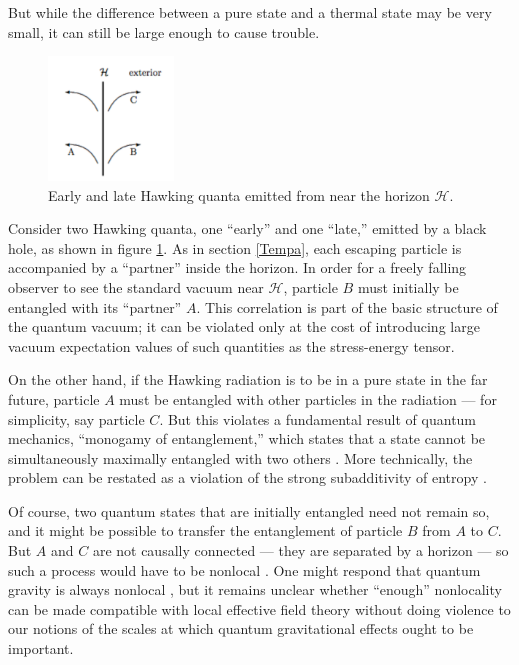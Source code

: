 \documentclass[12pt]{article}
\begin{document}
But while the difference between a pure state and a thermal state
may be very small, it can still be large enough to cause trouble.
\begin{figure}
\centerline{\includegraphics[height=1.3in]{unitary.pdf}}
\caption{Early and late Hawking quanta emitted from near the
horizon $\mathcal{H}$.}
\label{Carlipfig6}
\end{figure}
Consider two Hawking quanta, one ``early'' and one ``late,'' 
emitted by a black hole, as shown in figure \ref{Carlipfig6}.
As in section \ref{Tempa}, each escaping particle 
is accompanied by a ``partner'' inside the horizon.  In order 
for a freely falling observer to see the standard vacuum near
 $\mathcal{H}$, particle $B$ must initially be 
entangled with its ``partner'' $A$.  This correlation is part of 
the basic structure of the quantum vacuum; it can be violated 
only at the cost of introducing large vacuum expectation values 
of such quantities as the stress-energy tensor.

On the other hand, if the Hawking radiation is to be in a pure 
state in the far future, particle $A$ must be entangled with
other particles in the radiation --- for simplicity, say particle
$C$.  But this violates a fundamental result of quantum mechanics,
``monogamy of entanglement,'' which states that a state
cannot be simultaneously maximally entangled with two
others \cite{monogamy}.  More technically, the problem can be
restated as a violation of the strong subadditivity of entropy
\cite{AMPS}.

Of course, two quantum states that are initially entangled need
not remain so, and it might be possible to transfer the entanglement
of particle $B$ from $A$ to $C$.  But $A$ and $C$ are not causally 
connected --- they are separated by a horizon --- so such a process 
would have to be nonlocal
\cite{Giddingsz}.   One might respond that quantum gravity is
always nonlocal \cite{Jacobsonx,Papadodimasb}, but it remains 
unclear whether ``enough'' nonlocality can be made compatible 
with local effective field theory without doing violence to 
our notions of the scales at which quantum gravitational effects
ought to be important.
\end{document}
